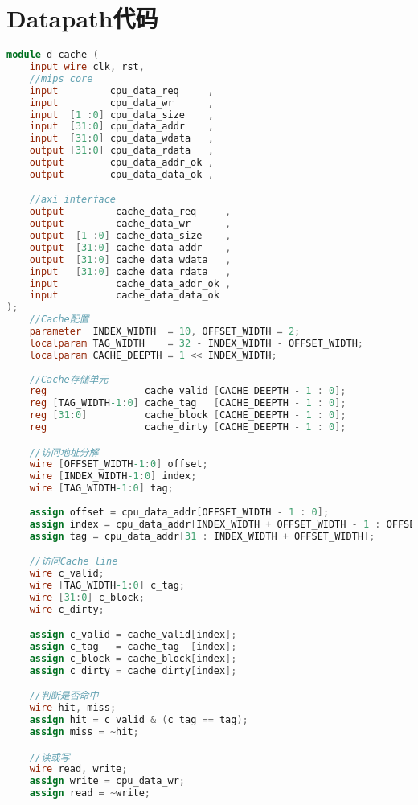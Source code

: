 \appendix
\section{Datapath代码}

\begin{lstlisting}[language=Verilog,frame=single]
module d_cache (
    input wire clk, rst,
    //mips core
    input         cpu_data_req     ,
    input         cpu_data_wr      ,
    input  [1 :0] cpu_data_size    ,
    input  [31:0] cpu_data_addr    ,
    input  [31:0] cpu_data_wdata   ,
    output [31:0] cpu_data_rdata   ,
    output        cpu_data_addr_ok ,
    output        cpu_data_data_ok ,

    //axi interface
    output         cache_data_req     ,
    output         cache_data_wr      ,
    output  [1 :0] cache_data_size    ,
    output  [31:0] cache_data_addr    ,
    output  [31:0] cache_data_wdata   ,
    input   [31:0] cache_data_rdata   ,
    input          cache_data_addr_ok ,
    input          cache_data_data_ok 
);
    //Cache配置
    parameter  INDEX_WIDTH  = 10, OFFSET_WIDTH = 2;
    localparam TAG_WIDTH    = 32 - INDEX_WIDTH - OFFSET_WIDTH;
    localparam CACHE_DEEPTH = 1 << INDEX_WIDTH;
    
    //Cache存储单元
    reg                 cache_valid [CACHE_DEEPTH - 1 : 0];
    reg [TAG_WIDTH-1:0] cache_tag   [CACHE_DEEPTH - 1 : 0];
    reg [31:0]          cache_block [CACHE_DEEPTH - 1 : 0];
    reg                 cache_dirty [CACHE_DEEPTH - 1 : 0];

    //访问地址分解
    wire [OFFSET_WIDTH-1:0] offset;
    wire [INDEX_WIDTH-1:0] index;
    wire [TAG_WIDTH-1:0] tag;
    
    assign offset = cpu_data_addr[OFFSET_WIDTH - 1 : 0];
    assign index = cpu_data_addr[INDEX_WIDTH + OFFSET_WIDTH - 1 : OFFSET_WIDTH];
    assign tag = cpu_data_addr[31 : INDEX_WIDTH + OFFSET_WIDTH];

    //访问Cache line
    wire c_valid;
    wire [TAG_WIDTH-1:0] c_tag;
    wire [31:0] c_block;
    wire c_dirty;

    assign c_valid = cache_valid[index];
    assign c_tag   = cache_tag  [index];
    assign c_block = cache_block[index];
    assign c_dirty = cache_dirty[index];

    //判断是否命中
    wire hit, miss;
    assign hit = c_valid & (c_tag == tag);
    assign miss = ~hit;

    //读或写
    wire read, write;
    assign write = cpu_data_wr;
    assign read = ~write;


\end{lstlisting}
